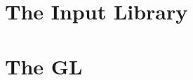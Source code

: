 \section{The Input Library}


\begin{outline}
\end{outline}



\section{The GL}


\begin{outline}
\end{outline}
